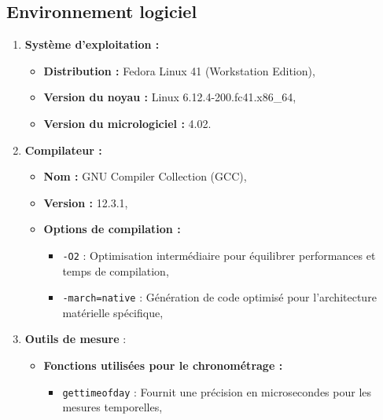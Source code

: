 \documentclass{rapport}
\begin{document}
      \subsection{Environnement logiciel} 
        \begin{enumerate}
          \item \textbf{Système d’exploitation :}

            \begin{itemize}
                \item \textbf{Distribution :} Fedora Linux 41 (Workstation Edition),
                \item \textbf{Version du noyau :} Linux 6.12.4-200.fc41.x86\_64,
                \item \textbf{Version du micrologiciel :} 4.02.
            \end{itemize}
            
          \item \textbf{Compilateur :}

            \begin{itemize}
                \item \textbf{Nom :} GNU Compiler Collection (GCC),
                \item \textbf{Version :} 12.3.1,
                \item \textbf{Options de compilation :}

                    \begin{itemize}
                        \item \verb:-O2: : Optimisation intermédiaire pour équilibrer performances et temps de compilation,
                        \item \verb:-march=native: : Génération de code optimisé pour l’architecture matérielle spécifique,
                    \end{itemize}
                
            \end{itemize}
          \item \textbf{Outils de mesure} :
            \begin{itemize}
                \item \textbf{Fonctions utilisées pour le chronométrage :}

                    \begin{itemize}
                        \item \verb:gettimeofday: : Fournit une précision en microsecondes pour les mesures temporelles,
                    \end{itemize}
            \end{itemize}
          
        \end{enumerate}
\end{document}
